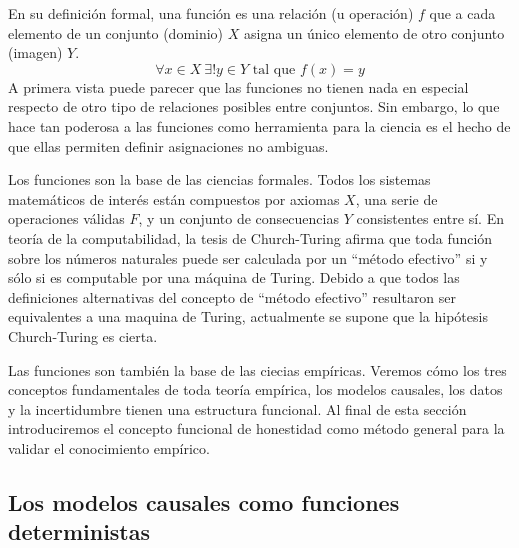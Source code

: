\documentclass[a4paper,10pt]{book}
\theoremstyle{definition}
\begin{document}

En su definición formal, una función es una relación (u operación) $f$ que a cada elemento de un conjunto (dominio) $X$ asigna un único elemento de otro conjunto (imagen) $Y$.
%
\begin{equation}
 \forall x \in X \  \exists! y \in Y \text{ tal que } f(x) = y    
\end{equation}
%
A primera vista puede parecer que las funciones no tienen nada en especial respecto de otro tipo de relaciones posibles entre conjuntos.
Sin embargo, lo que hace tan poderosa a las funciones como herramienta para la ciencia es el hecho de que ellas permiten definir asignaciones no ambiguas.


Los funciones son la base de las ciencias formales.
Todos los sistemas matemáticos de interés están compuestos por axiomas $X$, una serie de operaciones válidas $F$, y un conjunto de consecuencias $Y$ consistentes entre sí.
En teoría de la computabilidad, la tesis de Church-Turing afirma que toda función sobre los números naturales puede ser calculada por un ``método efectivo'' si y sólo si es computable por una máquina de Turing.
Debido a que todos las definiciones alternativas del concepto  de ``método efectivo'' resultaron ser equivalentes a una maquina de Turing, actualmente se supone que la hipótesis Church-Turing es cierta.


Las funciones son también la base de las ciecias empíricas.
Veremos cómo los tres conceptos fundamentales de toda teoría empírica, los modelos causales, los datos y la incertidumbre tienen una estructura funcional.
Al final de esta sección introduciremos el concepto funcional de honestidad como método general para la validar el conocimiento empírico.

\subsection{Los modelos causales como funciones deterministas}
\end{document}
